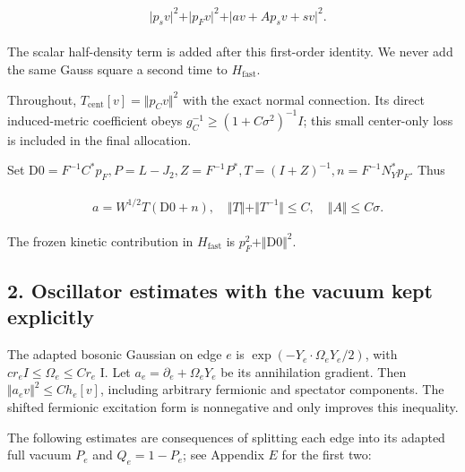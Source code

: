 \begin{gather*}
\begin{aligned}
& \vert p_{s} v\vert ^{2}+\vert p_{F} v\vert ^{2}+\vert a v+A p_{s} v+s v\vert ^{2}.
\end{aligned}\tag{1.1}
\end{gather*}

The scalar half-density term is added after this first-order identity.
We never add the same Gauss square a second time to
\(H_{\mathrm{fast}}\).

Throughout, \(T_{\mathrm{cent}}[v]=\Vert p_{C}v\Vert ^{2}\) with the
exact normal connection. Its direct induced-metric coefficient obeys
\(g_{C}^{-1}\ge (1+C \sigma ^{2})^{-1}I\); this small center-only loss
is included in the final allocation.

Set
\(\mathrm{D0}=F^{-1}C^{*}p_{F}, P=L-J_{2}, Z=F^{-1}P^{*}, T=(I+Z)^{-1}, n=F^{-1}N_{Y}^{*}p_{F}\).
Thus

\begin{gather*}
\begin{aligned}
& a=W^{1/2} T(\mathrm{D0}+n), \quad  \Vert T\Vert +\Vert T^{-1}\Vert \le C, \quad  \Vert A\Vert \le C \sigma  .
\end{aligned}\tag{1.2}
\end{gather*}

The frozen kinetic contribution in \(H_{\mathrm{fast}}\) is
\(p_{F}^{2}+\Vert \mathrm{D0}\Vert ^{2}\).

\subsection{2. Oscillator estimates with the vacuum kept
explicitly}\label{h-oscillator-estimates-with-the-vacuum-kept-explicitly}

The adapted bosonic Gaussian on edge \(e\) is
\(\exp (-Y_{e} \cdot  \Omega _{e}Y_{e}/2)\), with
\(c r_{e} I\le  \Omega _{e}\le C r_{e}\) I. Let
\(a_{e}= \partial  _{e}+ \Omega _{e}Y_{e}\) be its annihilation
gradient. Then \(\Vert a_{e} v\Vert ^{2}\le C h_{e}[v]\), including
arbitrary fermionic and spectator components. The shifted fermionic
excitation form is nonnegative and only improves this inequality.

The following estimates are consequences of splitting each edge into its
adapted full vacuum \(P_{e}\) and \(Q_{e}=1-P_{e}\); see Appendix \(E\)
for the first two:

